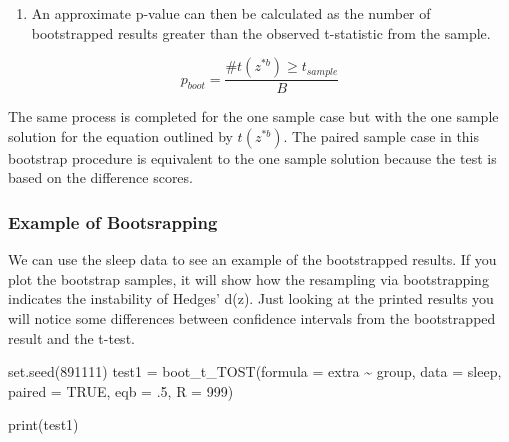 \documentclass[
]{interact}
\newenvironment{Shaded}{\begin{snugshade}}{\end{snugshade}}
\newcommand{\AttributeTok}[1]{\textcolor[rgb]{0.40,0.45,0.13}{#1}}
\newcommand{\ConstantTok}[1]{\textcolor[rgb]{0.56,0.35,0.01}{#1}}
\newcommand{\DecValTok}[1]{\textcolor[rgb]{0.68,0.00,0.00}{#1}}
\newcommand{\FunctionTok}[1]{\textcolor[rgb]{0.28,0.35,0.67}{#1}}
\newcommand{\NormalTok}[1]{\textcolor[rgb]{0.00,0.23,0.31}{#1}}
\newcommand{\OtherTok}[1]{\textcolor[rgb]{0.00,0.23,0.31}{#1}}
\newcommand{\SpecialCharTok}[1]{\textcolor[rgb]{0.37,0.37,0.37}{#1}}
\providecommand{\tightlist}{%
  \setlength{\itemsep}{0pt}\setlength{\parskip}{0pt}}\usepackage{longtable,booktabs,array}
\begin{document}
\begin{enumerate}
\def\labelenumi{\arabic{enumi}.}
\setcounter{enumi}{2}
\tightlist
\item
  An approximate p-value can then be calculated as the number of
  bootstrapped results greater than the observed t-statistic from the
  sample.
\end{enumerate}

\[
p_{boot} = \frac {\#t(z^{*b}) \ge t_{sample}}{B}
\]

The same process is completed for the one sample case but with the one
sample solution for the equation outlined by \(t(z^{*b})\). The paired
sample case in this bootstrap procedure is equivalent to the one sample
solution because the test is based on the difference scores.

\newpage

\hypertarget{example-of-bootsrapping}{%
\subsubsection{Example of Bootsrapping}\label{example-of-bootsrapping}}

We can use the sleep data to see an example of the bootstrapped results.
If you plot the bootstrap samples, it will show how the resampling via
bootstrapping indicates the instability of Hedges' d(z). Just looking at
the printed results you will notice some differences between confidence
intervals from the bootstrapped result and the t-test.

\begin{Shaded}
\begin{Highlighting}[]
\FunctionTok{set.seed}\NormalTok{(}\DecValTok{891111}\NormalTok{)}
\NormalTok{test1 }\OtherTok{=} \FunctionTok{boot\_t\_TOST}\NormalTok{(}\AttributeTok{formula =}\NormalTok{ extra }\SpecialCharTok{\textasciitilde{}}\NormalTok{ group,}
                    \AttributeTok{data =}\NormalTok{ sleep,}
                    \AttributeTok{paired =} \ConstantTok{TRUE}\NormalTok{,}
                    \AttributeTok{eqb =}\NormalTok{ .}\DecValTok{5}\NormalTok{,}
                    \AttributeTok{R =} \DecValTok{999}\NormalTok{)}


\FunctionTok{print}\NormalTok{(test1)}
\end{Highlighting}
\end{Shaded}
\end{document}
